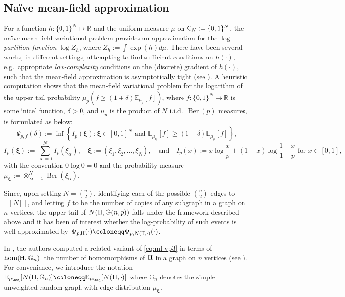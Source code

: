 \documentclass[a4paper,11pt,english,reqno]{amsart}
\numberwithin{equation}{section}
\newcommand{\R}{\mathbb{R}}
\newcommand{\E}{\mathbb{E}}
\newcommand{\uH}{\textup{H}}
\renewcommand{\P}{\mathbb{P}}
\newcommand{\G}{\mathbb{G}}
\newcommand{\tu}[1]{\textup{#1}}
\DeclareMathOperator{\dBer}{Ber}
\newcommand{\set}[1]{[\![#1]\!]}
\begin{document}
	\subsection{Na\"ive mean-field approximation}\label{sec:mean-field}
	For a function $h: \{0,1\}^N \mapsto \R$ and the uniform measure $\mu$ on ${\sf C}_N:= \{0,1\}^N$, the na\"ive mean-field variational problem provides an approximation for the {\em $\log$-partition function} $\log Z_h$, where $Z_h:=\int \exp(h) d\mu$.  
	There have been several works, in different settings, attempting to find sufficient conditions on $h(\cdot)$, e.g.~appropriate {\em low-complexity} conditions on the (discrete) gradient of $h(\cdot)$, such that the mean-field approximation is asymptotically tight (see \cite{augeri, austin, BM, chatterjeedembo, eldan, Yan}). 
	A heuristic computation shows that the mean-field variational problem for the logarithm of the upper tail probability  $\mu_p(f \ge (1+\delta) \E_{\mu_p}[f])$, where {$f : \{0,1\}^N \mapsto \R$} is some `nice' function, $\delta >0$, and $\mu_p$ is the product of $N$ i.i.d.~$\dBer(p)$ measures, is formulated as below:
	\begin{equation}\label{eq:mf-vp3}
		\Psi_{p,f}(\delta):= \inf \left\{ I_p({\bm \xi}): {\bm \xi} \in [0,1]^N \text{ and } \E_{\mu_{\bm \xi}}[f] \ge (1+\delta) \E_{\mu_p}[f]\right\},
	\end{equation}
	\[
	I_p({\bm \xi}):= \sum_{\upalpha=1}^N I_p(\xi_\alpha), \quad {\bm \xi}:= (\xi_1, \xi_2, \ldots, \xi_N), \quad \text{and} \quad I_p(x):= x \log \frac{x}{p} + (1-x) \log \frac{1-x}{1-p} \text{ for } x \in [0,1],
	\]
	with the convention $0 \log 0 = 0$ and  the probability measure $\mu_{\bm \xi}:=\otimes_{\upalpha=1}^N \dBer(\xi_\upalpha)$.   
	
	
	 
	
	
	Since, upon setting $N= {n \choose 2}$, identifying each of the possible ${n\choose2}$ edges to $\set{N}$, and letting $f$ to be the number of copies of any subgraph in a graph on $n$ vertices, the upper tail of $N(\uH, \G(n,p))$ falls under the framework described above and it has been of interest whether the log-probability of such events is well approximated by $\Psi_{p,\uH}(\cdot)\coloneqq \Psi_{p,N(\uH, \cdot)}(\cdot)$.
		
	
	In \cite{BGLZ}, the authors computed a related variant of \eqref{eq:mf-vp3} in terms of $\tu{hom}(\uH, \G_{n})$, the number of homomorphisms of $\uH$ in a graph on $n$ vertices (see \cite[Section~1.2]{BGLZ}). For convenience, we introduce the notation $\E_{\mu_{\bm \xi}}[N(\uH, \G_n)]\coloneqq \E_{\mu_{\bm \xi}}[N(\uH, \cdot)] $ where $\G_n$ denotes the simple unweighted random graph with edge distribution $\mu_{\bm \xi}$. %
		
\end{document}
